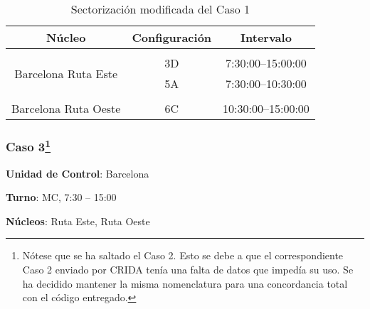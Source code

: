 \begin{table}[h]
	\centering
	\caption{Sectorización modificada del Caso 1}
	\begin{tabular}{ccc}
		\hline
		\textbf{Núcleo}                                           & \textbf{Configuración} & \textbf{Intervalo}   \\ \hline
		\multicolumn{1}{l}{}                                      & \multicolumn{1}{l}{}   & \multicolumn{1}{l}{} \\
		\multicolumn{1}{c|}{\multirow{2}{*}{Barcelona Ruta Este}} & 3D                     & 7:30:00--15:00:00    \\
		\multicolumn{1}{c|}{}                                     & 5A                     & 7:30:00--10:30:00    \\
		\multicolumn{1}{l}{}                                      & \multicolumn{1}{l}{}   & \multicolumn{1}{l}{} \\
		Barcelona Ruta Oeste                                      & 6C                     & 10:30:00--15:00:00   \\ \hline
	\end{tabular}
	\label{table:5:caso1-modif}
\end{table}


\subsubsection[Caso 3]{Caso 3\footnote{Nótese que se ha saltado el Caso 2. Esto se debe a que el correspondiente Caso 2 enviado por \gls{CRIDA} tenía una falta de datos que impedía su uso. Se ha decidido mantener la misma nomenclatura para una concordancia total con el código entregado.}}

\textbf{Unidad de Control}: Barcelona

\textbf{Turno}: MC, 7:30 -- 15:00

\textbf{Núcleos}: Ruta Este, Ruta Oeste

